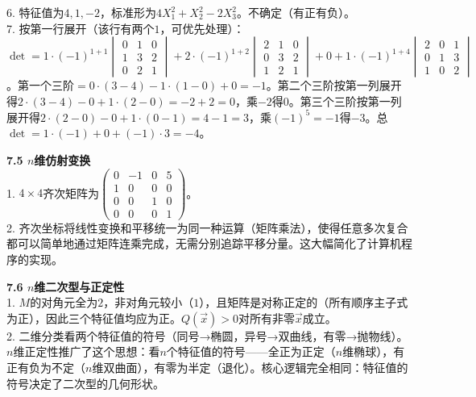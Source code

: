 6. 特征值为$4,1,-2$，标准形为$4X_1^2+X_2^2-2X_3^2$。不确定（有正有负）。\\
7. 按第一行展开（该行有两个$1$，可优先处理）：$\det=1\cdot(-1)^{1+1}\begin{vmatrix}0&1&0\\1&3&2\\0&2&1\end{vmatrix}+2\cdot(-1)^{1+2}\begin{vmatrix}2&1&0\\0&3&2\\1&2&1\end{vmatrix}+0+1\cdot(-1)^{1+4}\begin{vmatrix}2&0&1\\0&1&3\\1&0&2\end{vmatrix}$。第一个三阶$=0\cdot(3-4)-1\cdot(1-0)+0= -1$。第二个三阶按第一列展开得$2\cdot(3-4)-0+1\cdot(2-0)= -2+2=0$，乘$-2$得$0$。第三个三阶按第一列展开得$2\cdot(2-0)-0+1\cdot(0-1)=4-1=3$，乘$(-1)^{5}=-1$得$-3$。总$\det=1\cdot(-1)+0+(-1)\cdot3=-4$。

\noindent\textbf{7.5 $n$维仿射变换}\\
1. $4\times4$齐次矩阵为$\begin{pmatrix}0&-1&0&5\\1&0&0&0\\0&0&1&0\\0&0&0&1\end{pmatrix}$。\\
2. 齐次坐标将线性变换和平移统一为同一种运算（矩阵乘法），使得任意多次复合都可以简单地通过矩阵连乘完成，无需分别追踪平移分量。这大幅简化了计算机程序的实现。

\noindent\textbf{7.6 $n$维二次型与正定性}\\
1. $M$的对角元全为$2$，非对角元较小（$1$），且矩阵是对称正定的（所有顺序主子式为正），因此三个特征值均应为正。$Q(\vec x)>0$对所有非零$\vec x$成立。\\
2. 二维分类看两个特征值的符号（同号→椭圆，异号→双曲线，有零→抛物线）。$n$维正定性推广了这个思想：看$n$个特征值的符号——全正为正定（$n$维椭球），有正有负为不定（$n$维双曲面），有零为半定（退化）。核心逻辑完全相同：特征值的符号决定了二次型的几何形状。

